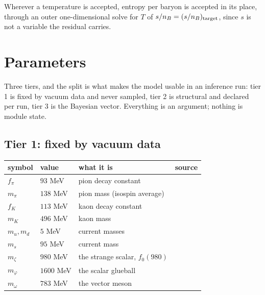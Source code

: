 \documentclass[11pt,a4paper]{article}
\begin{document}
Wherever a temperature is accepted, entropy per baryon is accepted in its
place, through an outer one-dimensional solve for $T$ of $s/n_B = (s/n_B)_{\rm
target}$, since $s$ is not a variable the residual carries.

\section{Parameters}
\label{sec:parameters}

Three tiers, and the split is what makes the model usable in an inference run:
tier 1 is fixed by vacuum data and never sampled, tier 2 is structural and
declared per run, tier 3 is the Bayesian vector. Everything is an argument;
nothing is module state.

\subsection{Tier 1: fixed by vacuum data}

\begin{center}
\begin{tabular}{llll}
\toprule
symbol & value & what it is & source \\
\midrule
$f_\pi$    & $93$ MeV   & pion decay constant & \cite{ParticleDataGroup2024} \\
$m_\pi$    & $138$ MeV  & pion mass (isospin average) & \cite{ParticleDataGroup2024} \\
$f_K$      & $113$ MeV  & kaon decay constant & \cite{ParticleDataGroup2024} \\
$m_K$      & $496$ MeV  & kaon mass & \cite{ParticleDataGroup2024} \\
$m_u,m_d$  & $5$ MeV    & current masses & \cite{ParticleDataGroup2024} \\
$m_s$      & $95$ MeV   & current mass & \cite{ParticleDataGroup2024} \\
$m_\zeta$  & $980$ MeV  & the strange scalar, $f_0(980)$ & \cite{ParticleDataGroup2024} \\
$m_\varphi$& $1600$ MeV & the scalar glueball & \cite{DragoFiolhaisTambini1996} \\
$m_\omega$ & $783$ MeV  & the vector meson & \cite{ParticleDataGroup2024} \\
\bottomrule
\end{tabular}
\end{center}
\end{document}
